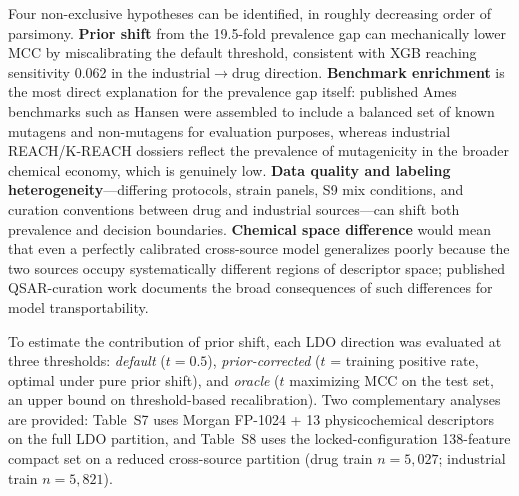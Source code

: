 Four non-exclusive hypotheses can be identified, in roughly decreasing order of parsimony.
\textbf{Prior shift} from the 19.5-fold prevalence gap can mechanically lower MCC by 
miscalibrating the default threshold, consistent with XGB reaching sensitivity 0.062 in the 
industrial$\to$drug direction. \textbf{Benchmark enrichment} is the most direct explanation 
for the prevalence gap itself: published Ames benchmarks such as 
Hansen\cite{Hansen_2009} were assembled to include a balanced set of known mutagens and 
non-mutagens for evaluation purposes, whereas industrial REACH/K-REACH dossiers reflect the 
prevalence of mutagenicity in the broader chemical economy, which is genuinely low. 
\textbf{Data quality and labeling heterogeneity}---differing protocols, strain panels, S9 
mix conditions, and curation conventions between drug and industrial sources---can shift 
both prevalence and decision boundaries. \textbf{Chemical space difference} would mean that 
even a perfectly calibrated cross-source model generalizes poorly because the two sources 
occupy systematically different regions of descriptor space; published QSAR-curation work 
documents the broad consequences of such differences for model 
transportability.\cite{Tropsha_2010,Fourches_2010}


To estimate the contribution of prior shift, each LDO direction was evaluated at three 
thresholds: \textit{default} ($t = 0.5$), \textit{prior-corrected} ($t$ = training positive 
rate, optimal under pure prior shift), and \textit{oracle} ($t$ maximizing MCC on the test 
set, an upper bound on threshold-based recalibration). Two complementary analyses are 
provided: Table~S7 uses Morgan FP-1024 + 13 physicochemical descriptors on the full LDO 
partition, and Table~S8 uses the locked-configuration 138-feature compact set on a reduced 
cross-source partition (drug train $n=5{,}027$; industrial train $n=5{,}821$).


